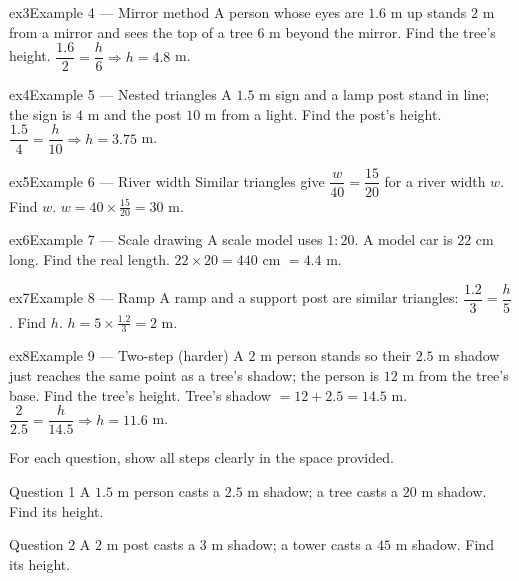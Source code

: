 \documentclass[11pt]{article}
\begin{document}
\begin{example}{ex3}{Example 4 --- Mirror method}
A person whose eyes are $1.6$ m up stands $2$ m from a mirror and sees the top of a tree $6$ m beyond the mirror. Find the tree's height.
\soln $\dfrac{1.6}{2}=\dfrac{h}{6}\Rightarrow h=4.8$ m.
\end{example}

\begin{example}{ex4}{Example 5 --- Nested triangles}
A $1.5$ m sign and a lamp post stand in line; the sign is $4$ m and the post $10$ m from a light. Find the post's height.
\soln $\dfrac{1.5}{4}=\dfrac{h}{10}\Rightarrow h=3.75$ m.
\end{example}

\begin{example}{ex5}{Example 6 --- River width}
Similar triangles give $\dfrac{w}{40}=\dfrac{15}{20}$ for a river width $w$. Find $w$.
\soln $w=40\times\tfrac{15}{20}=30$ m.
\end{example}

\begin{example}{ex6}{Example 7 --- Scale drawing}
A scale model uses $1:20$. A model car is $22$ cm long. Find the real length.
\soln $22\times20=440$ cm $=4.4$ m.
\end{example}

\begin{example}{ex7}{Example 8 --- Ramp}
A ramp and a support post are similar triangles: $\dfrac{1.2}{3}=\dfrac{h}{5}$. Find $h$.
\soln $h=5\times\tfrac{1.2}{3}=2$ m.
\end{example}

\begin{example}{ex8}{Example 9 --- Two-step (harder)}
A $2$ m person stands so their $2.5$ m shadow just reaches the same point as a tree's shadow; the person is $12$ m from the tree's base. Find the tree's height.
\soln Tree's shadow $=12+2.5=14.5$ m. $\dfrac{2}{2.5}=\dfrac{h}{14.5}\Rightarrow h=11.6$ m.
\end{example}

\clearpage
{}
For each question, show all steps clearly in the space provided.

\begin{qbox}{Question 1}
A $1.5$ m person casts a $2.5$ m shadow; a tree casts a $20$ m shadow. Find its height.\workspace{2.4cm}
\end{qbox}

\begin{qbox}{Question 2}
A $2$ m post casts a $3$ m shadow; a tower casts a $45$ m shadow. Find its height.\workspace{2.4cm}
\end{qbox}
\end{document}
